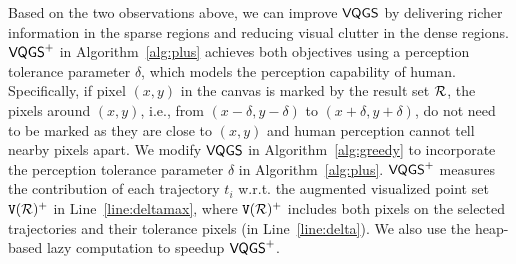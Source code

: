 
Based on the two observations above, we can improve  $\mathsf{VQGS}$ by delivering richer information in the sparse regions and reducing visual clutter in the dense regions.
$\mathsf{VQGS}^+$ in Algorithm~\ref{alg:plus} achieves both objectives using a perception tolerance parameter $\delta$, which models the perception capability of human.
Specifically, if pixel $(x,y)$ in the canvas is marked by the result set $\mathcal{R}$,
the pixels around $(x,y)$, i.e., from $(x-\delta, y-\delta)$ to $(x+\delta, y+\delta)$, do not need to be marked as they are close to $(x,y)$ and human perception cannot tell nearby pixels apart. We modify $\mathsf{VQGS}$ in Algorithm~\ref{alg:greedy} to incorporate the perception tolerance parameter $\delta$ in Algorithm~\ref{alg:plus}.
$\mathsf{VQGS}^+$ measures the contribution of each trajectory $t_i$ w.r.t. the augmented visualized point set $\mathtt{V}(\mathcal{R})^{+}$ in Line~\ref{line:deltamax},
where $\mathtt{V}(\mathcal{R})^{+}$ includes both pixels on the selected trajectories and their tolerance pixels (in Line~\ref{line:delta}).
We also use the heap-based lazy computation to speedup $\mathsf{VQGS}^+$.





